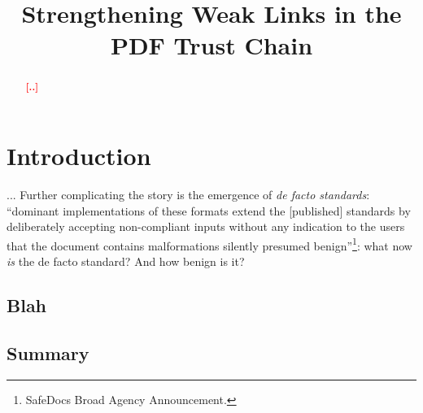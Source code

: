 \documentclass[conference,12pt]{IEEEtran}
\newcommand{\Todo}[1]{\textbf{\textcolor{red}{[#1]}}}
\begin{document}
\date{}

\title{Strengthening Weak Links in the PDF Trust Chain}

\author{
     \and
}

\maketitle

\begin{abstract}

\Todo{..}
  
\end{abstract}


\section{Introduction}


... Further complicating the story is the emergence of \emph{de facto standards}: ``dominant implementations of these formats extend the [published] standards by deliberately accepting non-compliant inputs without any indication to the users that the document contains malformations silently presumed benign''\footnote{SafeDocs Broad Agency Announcement.}: what now \emph{is} the de facto standard?  And how benign is it?

\subsection{Blah}

\subsection{Summary}
\end{document}
